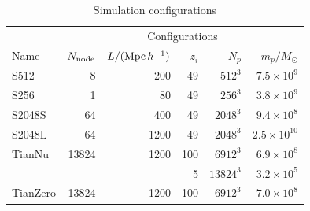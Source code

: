 \documentclass[10pt,twocolumn,reprint]{emulateapj}
\newcommand{\Msun}{M_\odot}
\begin{document}
\begin{table}[]
\centering
\caption{Simulation configurations}
\label{t.sim}
\begin{tabular}{lrrrrr}
\hline
& \multicolumn{5}{c}{Configurations}\\
\cline{2-6}
Name  & $N_{\rm node}$ & $L/({\rm Mpc\,}h^{-1})$ & $z_i$ & $N_p$ & $m_p/\Msun$ \\
\hline
S512   & 8     & 200   & 49   & $512^3$  & $7.5\times 10^9$    \\
S256   & 1     & 80    & 49   & $256^3$  & $3.8\times 10^9$    \\
S2048S & 64    & 400   & 49   & $2048^3$ & $9.4\times 10^8$    \\
S2048L & 64    & 1200  & 49   & $2048^3$ & $2.5\times 10^{10}$ \\
\hline
TianNu & 13824 & 1200  & 100  & $6912^3$ & $6.9\times 10^8$\\
       &       &       & 5    & $13824^3$& $3.2\times 10^5$\\
TianZero & 13824 & 1200 & 100 & $6912^3$ & $7.0\times 10^8$\\
\hline
\end{tabular}
\end{table}
\end{document}

